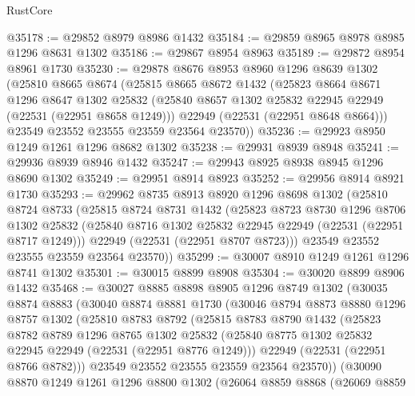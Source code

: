 \begin{lexlean}{RustCore}
\begin{coremodule}
@35178 := @29852 @8979 @8986 @1432
@35184 := @29859 @8965 @8978 @8985 @1296 @8631 @1302
@35186 := @29867 @8954 @8963
@35189 := @29872 @8954 @8961 @1730
@35230 := @29878
    @8676
    @8953
    @8960
    @1296
    @8639
    @1302
    (@25810
      @8665
      @8674
      (@25815
        @8665
        @8672
        @1432
        (@25823
          @8664
          @8671
          @1296
          @8647
          @1302
          @25832
          (@25840 @8657 @1302 @25832 @22945 @22949 (@22531 (@22951 @8658 @1249)))
          @22949
          (@22531 (@22951 @8648 @8664)))
        @23549
        @23552
        @23555
        @23559
        @23564
        @23570))
@35236 := @29923 @8950 @1249 @1261 @1296 @8682 @1302
@35238 := @29931 @8939 @8948
@35241 := @29936 @8939 @8946 @1432
@35247 := @29943 @8925 @8938 @8945 @1296 @8690 @1302
@35249 := @29951 @8914 @8923
@35252 := @29956 @8914 @8921 @1730
@35293 := @29962
    @8735
    @8913
    @8920
    @1296
    @8698
    @1302
    (@25810
      @8724
      @8733
      (@25815
        @8724
        @8731
        @1432
        (@25823
          @8723
          @8730
          @1296
          @8706
          @1302
          @25832
          (@25840 @8716 @1302 @25832 @22945 @22949 (@22531 (@22951 @8717 @1249)))
          @22949
          (@22531 (@22951 @8707 @8723)))
        @23549
        @23552
        @23555
        @23559
        @23564
        @23570))
@35299 := @30007 @8910 @1249 @1261 @1296 @8741 @1302
@35301 := @30015 @8899 @8908
@35304 := @30020 @8899 @8906 @1432
@35468 := @30027
    @8885
    @8898
    @8905
    @1296
    @8749
    @1302
    (@30035
      @8874
      @8883
      (@30040
        @8874
        @8881
        @1730
        (@30046
          @8794
          @8873
          @8880
          @1296
          @8757
          @1302
          (@25810
            @8783
            @8792
            (@25815
              @8783
              @8790
              @1432
              (@25823
                @8782
                @8789
                @1296
                @8765
                @1302
                @25832
                (@25840 @8775 @1302 @25832 @22945 @22949 (@22531 (@22951 @8776 @1249)))
                @22949
                (@22531 (@22951 @8766 @8782)))
              @23549
              @23552
              @23555
              @23559
              @23564
              @23570))
          (@30090
            @8870
            @1249
            @1261
            @1296
            @8800
            @1302
            (@26064
              @8859
              @8868
              (@26069
                @8859

\end{coremodule}
\end{lexlean}
